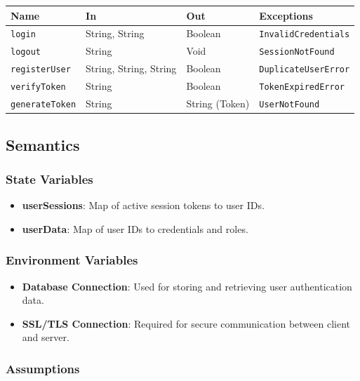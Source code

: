 \documentclass[12pt, titlepage]{article}
\begin{document}
\begin{center}
\begin{tabular}{|p{3cm} | p{4cm} | p{4cm} | p{4cm}|}
\hline
\textbf{Name} & \textbf{In} & \textbf{Out} & \textbf{Exceptions} \\
\hline
\texttt{login} & String, String & Boolean & \texttt{InvalidCredentials} \\
\texttt{logout} & String & Void & \texttt{SessionNotFound} \\
\texttt{registerUser} & String, String, String & Boolean & \texttt{DuplicateUserError} \\
\texttt{verifyToken} & String & Boolean & \texttt{TokenExpiredError} \\
\texttt{generateToken} & String & String (Token) & \texttt{UserNotFound} \\
\hline
\end{tabular}
\end{center}

\subsection{Semantics}

\subsubsection{State Variables}

\begin{itemize}
    \item \textbf{userSessions}: Map of active session tokens to user IDs.
    \item \textbf{userData}: Map of user IDs to credentials and roles.
\end{itemize}

\subsubsection{Environment Variables}

\begin{itemize}
    \item \textbf{Database Connection}: Used for storing and retrieving user authentication data.
    \item \textbf{SSL/TLS Connection}: Required for secure communication between client and server.
\end{itemize}

\subsubsection{Assumptions}
\end{document}
